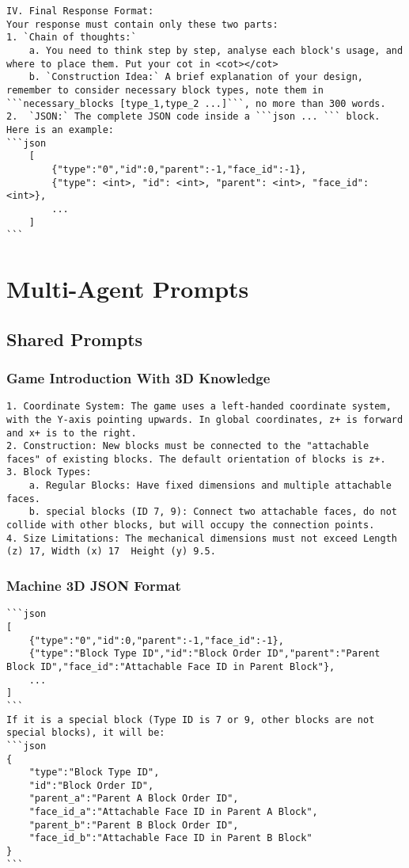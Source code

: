 \begin{lstlisting}
IV. Final Response Format:
Your response must contain only these two parts:
1. `Chain of thoughts:` 
    a. You need to think step by step, analyse each block's usage, and where to place them. Put your cot in <cot></cot>
    b. `Construction Idea:` A brief explanation of your design, remember to consider necessary block types, note them in ```necessary_blocks [type_1,type_2 ...]```, no more than 300 words.
2.  `JSON:` The complete JSON code inside a ```json ... ``` block. Here is an example: 
```json
    [
        {"type":"0","id":0,"parent":-1,"face_id":-1},
        {"type": <int>, "id": <int>, "parent": <int>, "face_id": <int>},
        ...
    ]
```
\end{lstlisting}


\newpage
\section{Multi-Agent Prompts}
\subsection{Shared Prompts}
\subsubsection{Game Introduction With 3D Knowledge}
\begin{lstlisting}
1. Coordinate System: The game uses a left-handed coordinate system, with the Y-axis pointing upwards. In global coordinates, z+ is forward and x+ is to the right.
2. Construction: New blocks must be connected to the "attachable faces" of existing blocks. The default orientation of blocks is z+.
3. Block Types:
    a. Regular Blocks: Have fixed dimensions and multiple attachable faces.
    b. special blocks (ID 7, 9): Connect two attachable faces, do not collide with other blocks, but will occupy the connection points.
4. Size Limitations: The mechanical dimensions must not exceed Length (z) 17, Width (x) 17  Height (y) 9.5.
\end{lstlisting}

\subsubsection{Machine 3D JSON Format}
\begin{lstlisting}
```json
[
    {"type":"0","id":0,"parent":-1,"face_id":-1},
    {"type":"Block Type ID","id":"Block Order ID","parent":"Parent Block ID","face_id":"Attachable Face ID in Parent Block"},
    ...
]
```
If it is a special block (Type ID is 7 or 9, other blocks are not special blocks), it will be:
```json
{
    "type":"Block Type ID",
    "id":"Block Order ID",
    "parent_a":"Parent A Block Order ID",
    "face_id_a":"Attachable Face ID in Parent A Block",
    "parent_b":"Parent B Block Order ID",
    "face_id_b":"Attachable Face ID in Parent B Block"
}
```
\end{lstlisting}


